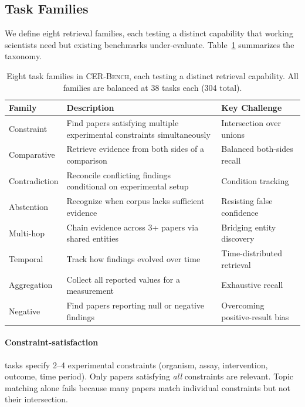 \documentclass{article}
\begin{document}
\subsection{Task Families}

We define eight retrieval families, each testing a distinct capability that working scientists need but existing benchmarks under-evaluate. Table~\ref{tab:families} summarizes the taxonomy.

\begin{table}[t]
\centering
\caption{Eight task families in \textsc{CER-Bench}, each testing a distinct retrieval capability. All families are balanced at 38 tasks each (304 total).}
\label{tab:families}
\small
\begin{tabular}{lp{5.5cm}l}
\toprule
\textbf{Family} & \textbf{Description} & \textbf{Key Challenge} \\
\midrule
Constraint & Find papers satisfying multiple experimental constraints simultaneously & Intersection over unions \\
Comparative & Retrieve evidence from both sides of a comparison & Balanced both-sides recall \\
Contradiction & Reconcile conflicting findings conditional on experimental setup & Condition tracking \\
Abstention & Recognize when corpus lacks sufficient evidence & Resisting false confidence \\
Multi-hop & Chain evidence across 3+ papers via shared entities & Bridging entity discovery \\
Temporal & Track how findings evolved over time & Time-distributed retrieval \\
Aggregation & Collect all reported values for a measurement & Exhaustive recall \\
Negative & Find papers reporting null or negative findings & Overcoming positive-result bias \\
\bottomrule
\end{tabular}
\end{table}

\paragraph{Constraint-satisfaction} tasks specify 2--4 experimental constraints (organism, assay, intervention, outcome, time period). Only papers satisfying \emph{all} constraints are relevant. Topic matching alone fails because many papers match individual constraints but not their intersection.
\end{document}
